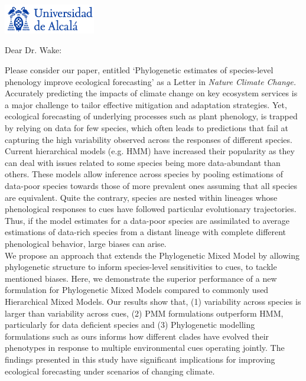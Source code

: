 \documentclass[11pt,a4paper]{letter}
\begin{document}
\begin{letter}{}
\includegraphics[width=0.3\textwidth]{logo_uah.png}

\opening{Dear Dr. Wake:}

\noindent Please consider our paper, entitled `Phylogenetic estimates of species-level phenology improve ecological forecasting' as a Letter in \emph{Nature Climate Change.} 
\vspace{1.5ex}\\
Accurately predicting the impacts of climate change on key ecosystem services is a major challenge to tailor effective mitigation and adaptation strategies. Yet, ecological forecasting of underlying processes such as plant phenology, is trapped by relying on data for few species, which often leads to predictions that fail at capturing the high variability observed across the responses of different species.
\vspace{1.5ex}\\
Current hierarchical models (e.g. HMM) have increased their popularity as they can deal with issues related to some species being more data-abundant than others. These models allow inference across species by pooling estimations of data-poor species towards those of more prevalent ones assuming that all species are equivalent. Quite the contrary, species are nested within lineages whose phenological responses to cues have followed particular evolutionary trajectories. Thus, if the model estimates for a data-poor species are assimilated to average estimations of data-rich species from a distant lineage with complete different phenological behavior, large biases can arise.
\vspace{1.5ex}\\
We propose an approach that extends the Phylogenetic Mixed Model by allowing phylogenetic structure to inform species-level sensitivities to cues, to tackle mentioned biases. Here, we demonstrate the superior performance of a new formulation for Phylogenetic Mixed Models compared to commonly used Hierarchical Mixed Models. Our results show that, (1) variability across species is larger than variability across cues, (2) PMM formulations outperform HMM, particularly for data deficient species and (3) Phylogenetic modelling formulations such as ours informs how different clades have evolved their phenotypes in response to multiple environmental cues operating jointly. The findings presented in this study have significant implications for improving ecological forecasting under scenarios of changing climate.

\end{letter}
\end{document}
